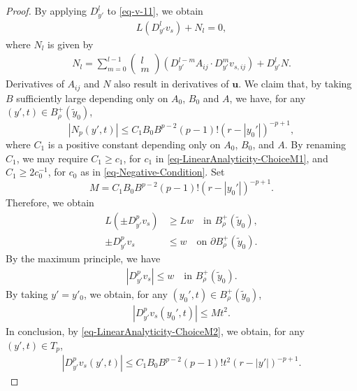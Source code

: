\documentclass[11pt,reqno]{amsart}
\renewcommand{\leq}{\leqslant}
\renewcommand{\geq}{\geqslant}
\theoremstyle{definition}
\numberwithin{equation}{section}
\begin{document}
\begin{proof}
By applying $D_{y'}^l$ to \eqref{eq-v-11}, we obtain 
\begin{align}\label{TS91}
L(D_{y'}^lv_s)+N_l=0,
\end{align}
where $N_l$ is given by 
\begin{align}
\label{eq-KeyExpressions2}N_l=
\sum_{m=0}^{l-1}
\left(\begin{matrix}l\\m\end{matrix}\right)\left(D_{y'}^{l-m}A_{ij}\cdot D_{y'}^mv_{s,ij}\right)
+D_{y'}^lN.    
\end{align}
Derivatives of $A_{ij}$ and $N$ also result in derivatives of 
$\mathbf u$.  
We claim that, by taking $B$ sufficiently large depending only on 
$A_0$, $B_0$ and $A$, we have, for any $(y',t)\in B^+_\rho(\tilde y_0)$,
\begin{equation}\label{eq-LinearAnalyticity-Estimate-f}
|N_p(y',t)|
\leq C_1 B_0B^{p-2}(p-1)!(r-|y_0'|)^{-p+1},
\end{equation}
where $C_1$ is a positive constant depending only on $A_0$, $B_0$, and $A$. By renaming 
$C_1$, we may require $C_1\geq  c_1$, for $c_1$ in \eqref{eq-LinearAnalyticity-ChoiceM1}, 
and $C_1\geq  2c_0^{-1}$, for $c_0$ as in \eqref{eq-Negative-Condition}. 
Set 
\begin{equation}\label{eq-LinearAnalyticity-ChoiceM2}
M= C_1 B_0B^{p-2}(p-1)!(r-|y_0'|)^{-p+1}.
\end{equation}
Therefore, we obtain 
\begin{align}
L(\pm D_{y'}^pv_s)&\geq  Lw\quad\text{in }B^+_\rho(\tilde y_0),\\
\pm D_{y'}^pv_s&\leq w\quad\text{on }\partial B^+_\rho(\tilde y_0).   
\end{align}
By the maximum principle, we have
\begin{align}
|D_{y'}^pv_s|\leq w\quad\text{in }B^+_\rho(\tilde y_0).    
\end{align}
By taking $y'=y'_0$, we obtain, for any $(y_0',t)\in B^+_\rho(\tilde y_0)$, 
\begin{align}|D_{y'}^pv_s(y_0',t)|\leq Mt^2.\end{align}
In conclusion, by \eqref{eq-LinearAnalyticity-ChoiceM2},
we obtain, 
for any $(y',t)\in T_p$, 
\begin{align}|D^p_{y'} v_s(y',t)|\leq C_1 B_0B^{p-2}(p-1)!t^2(r-|y'|)^{-p+1}.\end{align}



\end{proof}
\end{document}
